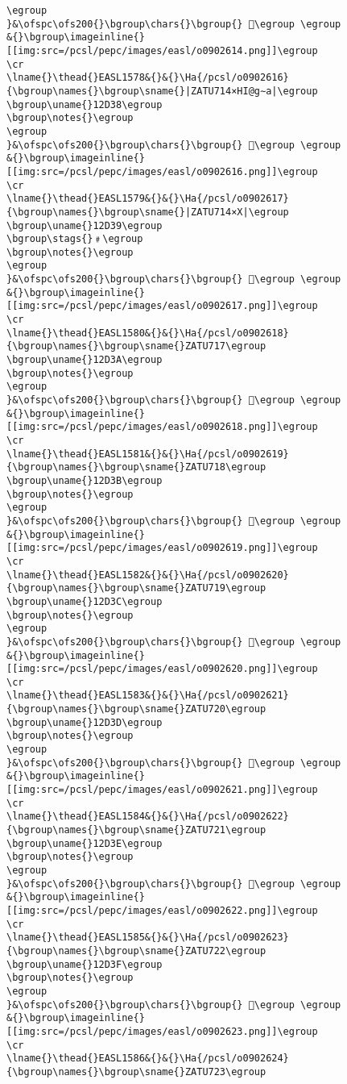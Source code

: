 \begin{verbatim}
\egroup
}&\ofspc\ofs200{}\bgroup\chars{}\bgroup{} 𒴷\egroup \egroup
&{}\bgroup\imageinline{}[[img:src=/pcsl/pepc/images/easl/o0902614.png]]\egroup
\cr
\lname{}\thead{}EASL1578&{}&{}\Ha{/pcsl/o0902616}{\bgroup\names{}\bgroup\sname{}|ZATU714×HI@g∼a|\egroup
\bgroup\uname{}12D38\egroup
\bgroup\notes{}\egroup
\egroup
}&\ofspc\ofs200{}\bgroup\chars{}\bgroup{} 𒴸\egroup \egroup
&{}\bgroup\imageinline{}[[img:src=/pcsl/pepc/images/easl/o0902616.png]]\egroup
\cr
\lname{}\thead{}EASL1579&{}&{}\Ha{/pcsl/o0902617}{\bgroup\names{}\bgroup\sname{}|ZATU714×X|\egroup
\bgroup\uname{}12D39\egroup
\bgroup\stags{}﹟\egroup
\bgroup\notes{}\egroup
\egroup
}&\ofspc\ofs200{}\bgroup\chars{}\bgroup{} 𒴹\egroup \egroup
&{}\bgroup\imageinline{}[[img:src=/pcsl/pepc/images/easl/o0902617.png]]\egroup
\cr
\lname{}\thead{}EASL1580&{}&{}\Ha{/pcsl/o0902618}{\bgroup\names{}\bgroup\sname{}ZATU717\egroup
\bgroup\uname{}12D3A\egroup
\bgroup\notes{}\egroup
\egroup
}&\ofspc\ofs200{}\bgroup\chars{}\bgroup{} 𒴺\egroup \egroup
&{}\bgroup\imageinline{}[[img:src=/pcsl/pepc/images/easl/o0902618.png]]\egroup
\cr
\lname{}\thead{}EASL1581&{}&{}\Ha{/pcsl/o0902619}{\bgroup\names{}\bgroup\sname{}ZATU718\egroup
\bgroup\uname{}12D3B\egroup
\bgroup\notes{}\egroup
\egroup
}&\ofspc\ofs200{}\bgroup\chars{}\bgroup{} 𒴻\egroup \egroup
&{}\bgroup\imageinline{}[[img:src=/pcsl/pepc/images/easl/o0902619.png]]\egroup
\cr
\lname{}\thead{}EASL1582&{}&{}\Ha{/pcsl/o0902620}{\bgroup\names{}\bgroup\sname{}ZATU719\egroup
\bgroup\uname{}12D3C\egroup
\bgroup\notes{}\egroup
\egroup
}&\ofspc\ofs200{}\bgroup\chars{}\bgroup{} 𒴼\egroup \egroup
&{}\bgroup\imageinline{}[[img:src=/pcsl/pepc/images/easl/o0902620.png]]\egroup
\cr
\lname{}\thead{}EASL1583&{}&{}\Ha{/pcsl/o0902621}{\bgroup\names{}\bgroup\sname{}ZATU720\egroup
\bgroup\uname{}12D3D\egroup
\bgroup\notes{}\egroup
\egroup
}&\ofspc\ofs200{}\bgroup\chars{}\bgroup{} 𒴽\egroup \egroup
&{}\bgroup\imageinline{}[[img:src=/pcsl/pepc/images/easl/o0902621.png]]\egroup
\cr
\lname{}\thead{}EASL1584&{}&{}\Ha{/pcsl/o0902622}{\bgroup\names{}\bgroup\sname{}ZATU721\egroup
\bgroup\uname{}12D3E\egroup
\bgroup\notes{}\egroup
\egroup
}&\ofspc\ofs200{}\bgroup\chars{}\bgroup{} 𒴾\egroup \egroup
&{}\bgroup\imageinline{}[[img:src=/pcsl/pepc/images/easl/o0902622.png]]\egroup
\cr
\lname{}\thead{}EASL1585&{}&{}\Ha{/pcsl/o0902623}{\bgroup\names{}\bgroup\sname{}ZATU722\egroup
\bgroup\uname{}12D3F\egroup
\bgroup\notes{}\egroup
\egroup
}&\ofspc\ofs200{}\bgroup\chars{}\bgroup{} 𒴿\egroup \egroup
&{}\bgroup\imageinline{}[[img:src=/pcsl/pepc/images/easl/o0902623.png]]\egroup
\cr
\lname{}\thead{}EASL1586&{}&{}\Ha{/pcsl/o0902624}{\bgroup\names{}\bgroup\sname{}ZATU723\egroup

\end{verbatim}
